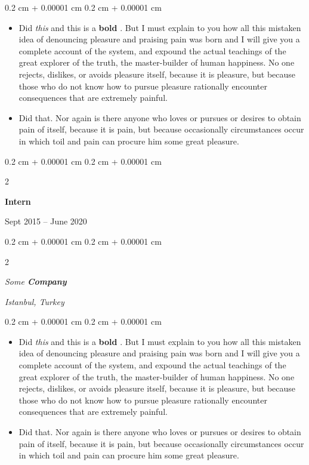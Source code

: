 \documentclass[10pt, letterpaper]{article}
\newenvironment{highlights}{
    \begin{itemize}[
        topsep=0.10 cm,
        parsep=0.10 cm,
        partopsep=0pt,
        itemsep=0pt,
        leftmargin=0.4 cm + 10pt
    ]
}{
    \end{itemize}
} %
\newenvironment{onecolentry}{
    \begin{adjustwidth}{
        0.2 cm + 0.00001 cm
    }{
        0.2 cm + 0.00001 cm
    }
}{
    \end{adjustwidth}
} %
\newenvironment{twocolentry}[2][]{
    \onecolentry
    \def\secondColumn{#2}
    \setcolumnwidth{\fill, 4.5 cm}
    \begin{paracol}{2}
}{
    \switchcolumn \raggedleft \secondColumn
    \end{paracol}
    \endonecolentry
} %
\let\hrefWithoutArrow\href
\renewcommand{\href}[2]{\hrefWithoutArrow{#1}{\ifthenelse{\equal{#2}{}}{ }{#2 }\raisebox{.15ex}{\footnotesize \faExternalLink*}}}
\begin{document}
        \vspace{0.10 cm}
        \begin{onecolentry}
            \begin{highlights}
                \item Did \textit{this} and this is a \textbf{bold} \href{https://example.com}{link}. But I must explain to you how all this mistaken idea of denouncing pleasure and praising pain was born and I will give you a complete account of the system, and expound the actual teachings of the great explorer of the truth, the master-builder of human happiness. No one rejects, dislikes, or avoids pleasure itself, because it is pleasure, but because those who do not know how to pursue pleasure rationally encounter consequences that are extremely painful.
                \item Did that. Nor again is there anyone who loves or pursues or desires to obtain pain of itself, because it is pain, but because occasionally circumstances occur in which toil and pain can procure him some great pleasure.
            \end{highlights}
        \end{onecolentry}


        \vspace{0.2 cm}

                \begin{twocolentry}{
                    Sept 2015 – June 2020
                }
                \textbf{Intern}
                \end{twocolentry}
            \begin{twocolentry}{
        \textit{Istanbul, Turkey}    }
            \textit{Some \textbf{Company}}
            \end{twocolentry}

        \vspace{0.10 cm}
        \begin{onecolentry}
            \begin{highlights}
                \item Did \textit{this} and this is a \textbf{bold} \href{https://example.com}{link}. But I must explain to you how all this mistaken idea of denouncing pleasure and praising pain was born and I will give you a complete account of the system, and expound the actual teachings of the great explorer of the truth, the master-builder of human happiness. No one rejects, dislikes, or avoids pleasure itself, because it is pleasure, but because those who do not know how to pursue pleasure rationally encounter consequences that are extremely painful.
                \item Did that. Nor again is there anyone who loves or pursues or desires to obtain pain of itself, because it is pain, but because occasionally circumstances occur in which toil and pain can procure him some great pleasure.
            \end{highlights}
        \end{onecolentry}
\end{document}
